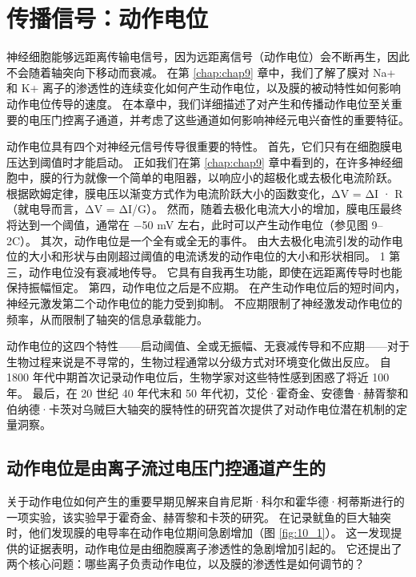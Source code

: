\chapter{传播信号：动作电位} \label{chap:chap10}
神经细胞能够远距离传输电信号，因为远距离信号（动作电位）会不断再生，因此不会随着轴突向下移动而衰减。 
在第 \ref{chap:chap9} 章中，我们了解了膜对 Na+ 和 K+ 离子的渗透性的连续变化如何产生动作电位，以及膜的被动特性如何影响动作电位传导的速度。 
在本章中，我们详细描述了对产生和传播动作电位至关重要的电压门控离子通道，并考虑了这些通道如何影响神经元电兴奋性的重要特征。


动作电位具有四个对神经元信号传导很重要的特性。 
首先，它们只有在细胞膜电压达到阈值时才能启动。 
正如我们在第 \ref{chap:chap9} 章中看到的，在许多神经细胞中，膜的行为就像一个简单的电阻器，以响应小的超极化或去极化电流阶跃。 
根据欧姆定律，膜电压以渐变方式作为电流阶跃大小的函数变化，ΔV = ΔI · R（就电导而言，ΔV = ΔI/G）。 
然而，随着去极化电流大小的增加，膜电压最终将达到一个阈值，通常在 −50 mV 左右，此时可以产生动作电位（参见图 9–2C）。 
其次，动作电位是一个全有或全无的事件。 
由大去极化电流引发的动作电位的大小和形状与由刚超过阈值的电流诱发的动作电位的大小和形状相同。
1 第三，动作电位没有衰减地传导。 
它具有自我再生功能，即使在远距离传导时也能保持振幅恒定。 
第四，动作电位之后是不应期。 
在产生动作电位后的短时间内，神经元激发第二个动作电位的能力受到抑制。 
不应期限制了神经激发动作电位的频率，从而限制了轴突的信息承载能力。


动作电位的这四个特性——启动阈值、全或无振幅、无衰减传导和不应期——对于生物过程来说是不寻常的，生物过程通常以分级方式对环境变化做出反应。 
自 1800 年代中期首次记录动作电位后，生物学家对这些特性感到困惑了将近 100 年。 
最后，在 20 世纪 40 年代末和 50 年代初，艾伦·霍奇金、安德鲁·赫胥黎和伯纳德·卡茨对乌贼巨大轴突的膜特性的研究首次提供了对动作电位潜在机制的定量洞察。


\section{动作电位是由离子流过电压门控通道产生的}
关于动作电位如何产生的重要早期见解来自肯尼斯·科尔和霍华德·柯蒂斯进行的一项实验，该实验早于霍奇金、赫胥黎和卡茨的研究。 
在记录鱿鱼的巨大轴突时，他们发现膜的电导率在动作电位期间急剧增加（图 \ref{fig:10_1}）。 
这一发现提供的证据表明，动作电位是由细胞膜离子渗透性的急剧增加引起的。 
它还提出了两个核心问题：哪些离子负责动作电位，以及膜的渗透性是如何调节的？

